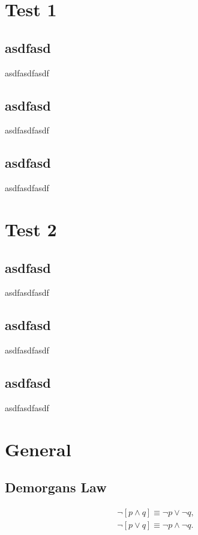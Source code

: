 \documentclass[10pt]{article}
\begin{document}
\begin{multicols}{3}

    \section*{Test 1}
    \subsection*{asdfasd}
    asdfasdfasdf
    \subsection*{asdfasd}
    asdfasdfasdf
    \subsection*{asdfasd}
    asdfasdfasdf

    \section*{Test 2}
    \subsection*{asdfasd}
    asdfasdfasdf
    \subsection*{asdfasd}
    asdfasdfasdf
    \subsection*{asdfasd}
    asdfasdfasdf

    \section*{General}
    \subsection*{Demorgans Law}
    \begin{align}
        \neg[p\wedge q]\equiv\neg p\vee\neg q,\\
        \neg[p\vee q]\equiv\neg p\wedge\neg q.
    \end{align}

\end{multicols}
\end{document}
